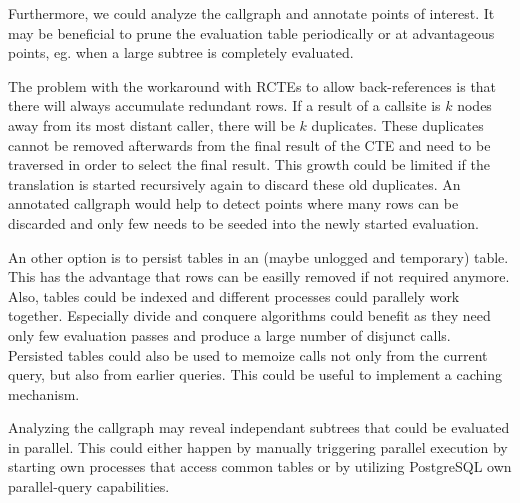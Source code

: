 Furthermore, we could analyze the callgraph and annotate points of interest. It may be beneficial to prune the evaluation table periodically or at advantageous points, eg. when a large subtree is completely evaluated.

The problem with the workaround with RCTEs to allow back-references is that there will always accumulate redundant rows. If a result of a callsite is $k$ nodes away from its most distant caller, there will be $k$ duplicates. These duplicates cannot be removed afterwards from the final result of the CTE and need to be traversed in order to select the final result.
This growth could be limited if the translation is started recursively again to discard these old duplicates. An annotated callgraph would help to detect points where many rows can be discarded and only few needs to be seeded into the newly started evaluation.

An other option is to persist tables in an (maybe unlogged and temporary) table. This has the advantage that rows can be easilly removed if not required anymore. Also, tables could be indexed and different processes could parallely work together. Especially divide and conquere algorithms could benefit as they need only few evaluation passes and produce a large number of disjunct calls.\\
Persisted tables could also be used to memoize calls not only from the current query, but also from earlier queries. This could be useful to implement a caching mechanism.

Analyzing the callgraph may reveal independant subtrees that could be evaluated in parallel. This could either happen by manually triggering parallel execution by starting own processes that access common tables or by utilizing PostgreSQL own parallel-query capabilities. 